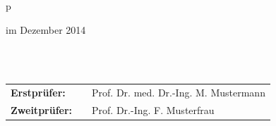 \begin{center}
\begin{tabular}{p{\textwidth}}
\begin{center}
\large{im Dezember 2014}
\end{center}

\\

\\

\begin{center}
\begin{tabular}{lll}
\textbf{Erstprüfer:} & & Prof. Dr. med. Dr.-Ing. M. Mustermann\\
\textbf{Zweitprüfer:} & &Prof. Dr.-Ing. F. Musterfrau\\
\end{tabular}
\end{center}

\end{tabular}
\end{center}
